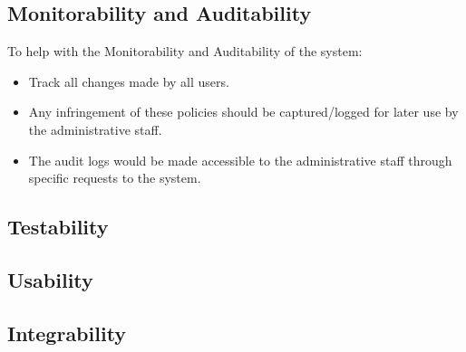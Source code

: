 \subsection{Monitorability and Auditability}
\begin{flushleft}
To help with the Monitorability and Auditability of the system:
\begin{itemize}
\item Track all changes made by all users. 
\item Any infringement of these policies should be captured/logged for later use by the administrative staff.
\item The audit logs would be made accessible to the administrative staff through specific requests to the system. 
\end{itemize}
\end{flushleft}

\subsection{Testability}
\begin{flushleft}

\end{flushleft}

\subsection{Usability}
\begin{flushleft}

\end{flushleft}

\subsection{Integrability}
\begin{flushleft}

\end{flushleft}